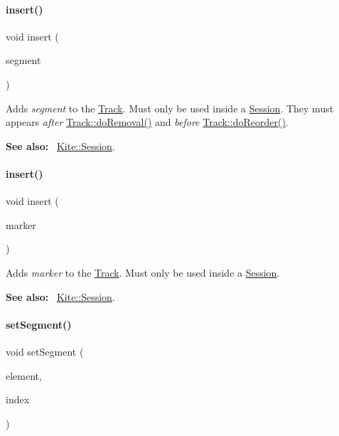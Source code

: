 \paragraph{\texorpdfstring{insert()}{insert()}\hspace{0.1cm}{\footnotesize\ttfamily [1/2]}}
{\footnotesize\ttfamily void insert (\begin{DoxyParamCaption}\item[{\hyperlink{classKite_1_1TrackElement}{Track\+Element} $\ast$}]{segment }\end{DoxyParamCaption})}

Adds {\itshape segment} to the \hyperlink{classKite_1_1Track}{Track}. Must only be used inside a \hyperlink{classKite_1_1Session}{Session}. They must appears {\itshape after} \hyperlink{classKite_1_1Track_abfffcd781865b94f62f27a1e7be99a38}{Track\+::do\+Removal()} and {\itshape before} \hyperlink{classKite_1_1Track_aaccb9224f5b38ecd8506fd1eec9ef5ca}{Track\+::do\+Reorder()}.

{\bfseries See also\+:}~ \hyperlink{classKite_1_1Session}{Kite\+::\+Session}. \mbox{\label{classKite_1_1Track_a31e8f4502866435ac898c7eec741175f}} 
\paragraph{\texorpdfstring{insert()}{insert()}\hspace{0.1cm}{\footnotesize\ttfamily [2/2]}}
{\footnotesize\ttfamily void insert (\begin{DoxyParamCaption}\item[{\hyperlink{classKite_1_1TrackMarker}{Track\+Marker} $\ast$}]{marker }\end{DoxyParamCaption})}

Adds {\itshape marker} to the \hyperlink{classKite_1_1Track}{Track}. Must only be used inside a \hyperlink{classKite_1_1Session}{Session}.

{\bfseries See also\+:}~ \hyperlink{classKite_1_1Session}{Kite\+::\+Session}. \mbox{\label{classKite_1_1Track_a8b5d93406ef581c1be022417238a89ca}} 
\paragraph{\texorpdfstring{set\+Segment()}{setSegment()}}
{\footnotesize\ttfamily void set\+Segment (\begin{DoxyParamCaption}\item[{\hyperlink{classKite_1_1TrackElement}{Track\+Element} $\ast$}]{element,  }\item[{size\+\_\+t}]{index }\end{DoxyParamCaption})}

